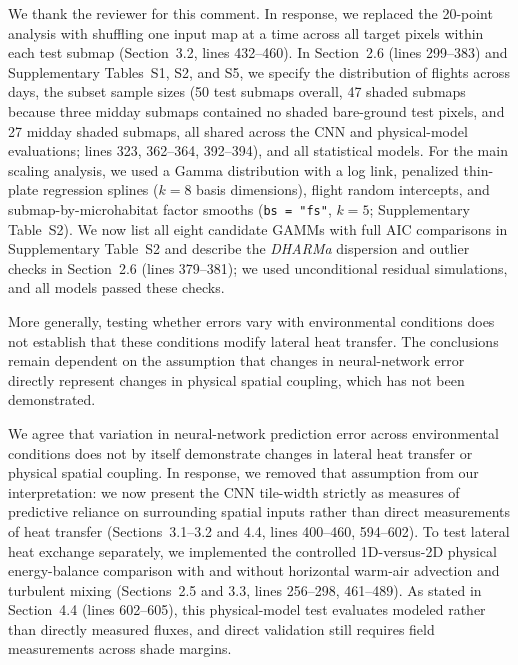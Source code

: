 \documentclass[12pt,english]{reviewresponse}
\begin{document}
\begin{revresponse}
We thank the reviewer for this comment. In response, we replaced the 20-point analysis with shuffling one input map at a time across all target pixels within each test submap (Section~3.2, lines 432--460). In Section~2.6 (lines 299--383) and Supplementary Tables~S1, S2, and S5, we specify the distribution of flights across days, the subset sample sizes (50 test submaps overall, 47 shaded submaps because three midday submaps contained no shaded bare-ground test pixels, and 27 midday shaded submaps, all shared across the CNN and physical-model evaluations; lines 323, 362--364, 392--394), and all statistical models. For the main scaling analysis, we used a Gamma distribution with a log link, penalized thin-plate regression splines ($k = 8$ basis dimensions), flight random intercepts, and submap-by-microhabitat factor smooths (\texttt{bs = "fs"}, $k = 5$; Supplementary Table~S2). We now list all eight candidate GAMMs with full AIC comparisons in Supplementary Table~S2 and describe the \textit{DHARMa} dispersion and outlier checks in Section~2.6 (lines 379--381); we used unconditional residual simulations, and all models passed these checks.
\end{revresponse}

\addtocounter{revcomment}{-1}
\begin{revcomment}[adjusted title={Comment 8 (Part 2)}]
More generally, testing whether errors vary with environmental conditions does not establish that these conditions modify lateral heat transfer. The conclusions remain dependent on the assumption that changes in neural-network error directly represent changes in physical spatial coupling, which has not been demonstrated.
\end{revcomment}

\begin{revresponse}
We agree that variation in neural-network prediction error across environmental conditions does not by itself demonstrate changes in lateral heat transfer or physical spatial coupling. In response, we removed that assumption from our interpretation: we now present the CNN tile-width strictly as measures of predictive reliance on surrounding spatial inputs rather than direct measurements of heat transfer (Sections~3.1--3.2 and 4.4, lines 400--460, 594--602). To test lateral heat exchange separately, we implemented the controlled 1D-versus-2D physical energy-balance comparison with and without horizontal warm-air advection and turbulent mixing (Sections~2.5 and 3.3, lines 256--298, 461--489). As stated in Section~4.4 (lines 602--605), this physical-model test evaluates modeled rather than directly measured fluxes, and direct validation still requires field measurements across shade margins.
\end{revresponse}
\end{document}
